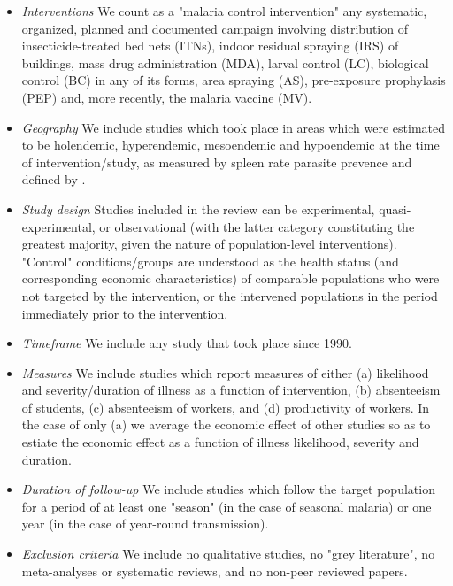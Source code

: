 \documentclass{article}
\begin{document}
\begin{itemize}
  \setlength\itemsep{-1em}

\item \emph{Interventions} We count as a "malaria control intervention" any systematic, organized, planned and documented campaign involving distribution of insecticide-treated bed nets (ITNs), indoor residual spraying (IRS) of buildings, mass drug administration (MDA), larval control (LC), biological control (BC) in any of its forms, area spraying (AS), pre-exposure prophylasis (PEP) and, more recently, the malaria vaccine (MV). \\
\item \emph{Geography} We include studies which took place in areas which were estimated to be holendemic, hyperendemic, mesoendemic and hypoendemic at the time of intervention/study, as measured by spleen rate parasite prevence and defined by \cite{Hay2008}. \\
\item \emph{Study design} Studies included in the review can be experimental, quasi-experimental, or observational (with the latter category constituting the greatest majority, given the nature of population-level interventions). "Control" conditions/groups are understood as the health status (and corresponding economic characteristics) of comparable populations who were not targeted by the intervention, or the intervened populations in the period immediately prior to the intervention. \\ 
\item \emph{Timeframe} We include any study that took place since 1990. \\
\item \emph{Measures} We include studies which report measures of either (a) likelihood and severity/duration of illness as a function of intervention, (b) absenteeism of students, (c) absenteeism of workers, and (d) productivity of workers. In the case of only (a) we average the economic effect of other studies so as to estiate the economic effect as a function of illness likelihood, severity and duration. \\
\item \emph{Duration of follow-up} We include studies which follow the target population for a period of at least one "season" (in the case of seasonal malaria) or one year (in the case of year-round transmission). \\
\item \emph{Exclusion criteria} We include no qualitative studies, no "grey literature", no meta-analyses or systematic reviews, and no non-peer reviewed papers.
\end{itemize}
\end{document}

